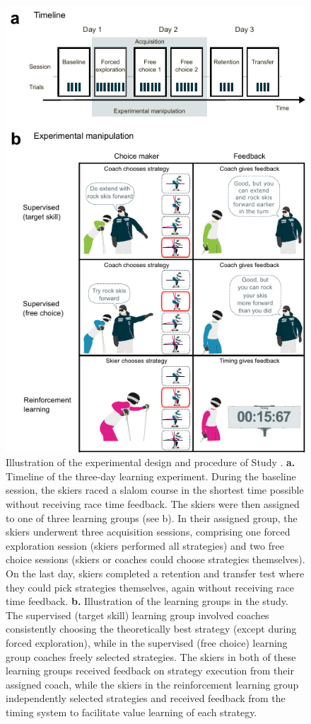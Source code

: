 \begin{figure}[H]
\centering
\includegraphics{figure_method_experiment.pdf}
\caption[Illustration of the experimental design and procedure of Study ]{Illustration of the experimental design and procedure of Study . \textbf{a.} Timeline of the three-day learning experiment. During the baseline session, the skiers raced a slalom course in the shortest time possible without receiving race time feedback. The skiers were then assigned to one of three learning groups (see b). In their assigned group, the skiers underwent three acquisition sessions, comprising one forced exploration session (skiers performed all strategies) and two free choice sessions (skiers or coaches could choose strategies themselves). On the last day, skiers completed a retention and transfer test where they could pick strategies themselves, again without receiving race time feedback. \textbf{b.} Illustration of the learning groups in the study. The supervised (target skill) learning group involved coaches consistently choosing the theoretically best strategy (except during forced exploration), while in the supervised (free choice) learning group coaches freely selected strategies. The skiers in both of these learning groups received feedback on strategy execution from their assigned coach, while the skiers in the reinforcement learning group independently selected strategies and received feedback from the timing system to facilitate value learning of each strategy.}\label{fig: rlillustration}
\end{figure}
